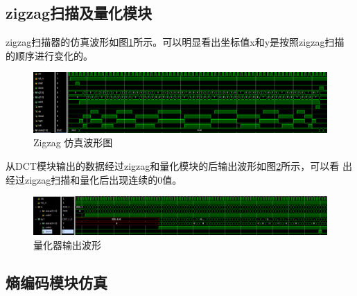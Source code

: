 \documentclass{article}
\numberwithin {equation}{section}
\begin{document}
\begin{spacing}{1.25}
  \subsection{zigzag扫描及量化模块}
    zigzag扫描器的仿真波形如图\ref{scannerWave}所示。可以明显看出坐标值x和y是按照zigzag扫描
    的顺序进行变化的。
      \begin{figure}[H]
        \centering
        \includegraphics[scale=0.4]{./pictures/scannerWave.png}
        \caption{Zigzag 仿真波形图}
        \label{scannerWave}
      \end{figure}

    从DCT模块输出的数据经过zigzag和量化模块的后输出波形如图\ref{quantizer wave}所示，可以看
    出经过zigzag扫描和量化后出现连续的0值。
    \begin{figure}[H]
      \centering
      \includegraphics[scale=0.25]{./pictures/quantizerSim.png}
      \caption{量化器输出波形}
      \label{quantizer wave}
    \end{figure}
  \subsection{熵编码模块仿真}
\newpage

\



\end{spacing}
\end{document}
